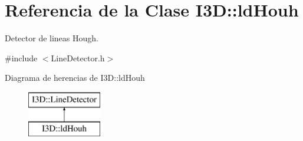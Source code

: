 \hypertarget{class_i3_d_1_1ld_houh}{}\section{Referencia de la Clase I3D\+:\+:ld\+Houh}
\label{class_i3_d_1_1ld_houh}


Detector de lineas Hough.  




{\ttfamily \#include $<$Line\+Detector.\+h$>$}

Diagrama de herencias de I3D\+:\+:ld\+Houh\begin{figure}[H]
\begin{center}
\leavevmode
\includegraphics[height=2.000000cm]{class_i3_d_1_1ld_houh}
\end{center}
\end{figure}
